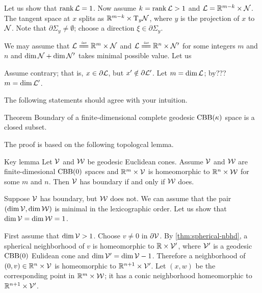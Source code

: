 Let us show that $\operatorname{\rm rank}\nolimits \mathcal{L}=1$.
Now assume $k=\operatorname{\rm rank}\nolimits \mathcal{L}>1$ and $\mathcal{L}=\mathbb{R}^{m-k}\times \mathcal{N}$.
The tangent space at $x$ splits as $\mathbb{R}^{m-k}\times \mathrm{T}_{y}\mathcal{N}$, where $y$ is the projection of $x$ to $\mathcal{N}$.
Note that $\partial\Sigma_y\ne\emptyset$;
choose a direction $\xi\in\partial\Sigma_y$.



We may assume that $\spc{L}\iso\RR^m\times \spc{N}$ and $\spc{L}\iso\RR^n\times \spc{N}'$
for some integers $m$ and $n$ and $\operatorname{\rm dim}\nolimits \mathcal{N}+\operatorname{\rm dim}\nolimits \mathcal{N}'$ takes minimal possible value.
Let us 

Assume contrary; that is, $x\in \partial \mathcal{L}$, but $x'\notin \partial \mathcal{L}'$.
Let $m=\operatorname{\rm dim}\nolimits \mathcal{L}$; by??? $m=\operatorname{\rm dim}\nolimits\mathcal{L}'$.

\qeds




The following statements should agree with your intuition.

\begin{thm}{Theorem}\label{thm:bry-closed}
Boundary of a finite-dimensional complete geodesic $\mathrm{CBB}(\kappa)$ space is a closed subset.
\end{thm}

The proof is based on the following topologcal lemma.

\begin{thm}{Key lemma}\label{lem:bry-closed:key}
Let $\mathcal{V}$ and $\mathcal{W}$ be geodesic Euclidean cones.
Assume $\mathcal{V}$ and $\mathcal{W}$ are finite-dimesional $\mathrm{CBB}(0)$ spaces
and $\mathbb{R}^{m}\times \mathcal{V}$ is homeomorphic to $\mathbb{R}^{n}\times \mathcal{W}$ for some $m$ and $n$.
Then $\mathcal{V}$ has boundary if and only if $\mathcal{W}$ does.
\end{thm}

Suppose $\mathcal{V}$ has boundary, but $\mathcal{W}$ does not.
We can assume that the pair $(\operatorname{\rm dim}\nolimits \mathcal{V},\operatorname{\rm dim}\nolimits \mathcal{W})$ is minimal in the lexicographic order.
Let us show that $\operatorname{\rm dim}\nolimits \mathcal{V}=\operatorname{\rm dim}\nolimits \mathcal{W}=1$.

First assume that $\operatorname{\rm dim}\nolimits \mathcal{V}>1$.
Choose $v\ne 0$ in $\partial\mathcal{V}$.
By \ref{thm:spherical-nbhd}, a spherical neighborhood of $v$ is homeomorphic to $\mathbb{R}\times \mathcal{V}'$, where $\mathcal{V}'$ is a geodesic $\mathrm{CBB}(0)$ Eulidean cone and $\operatorname{\rm dim}\nolimits \mathcal{V}'=\operatorname{\rm dim}\nolimits \mathcal{V}-1$.
Therefore a neighborhood of $(0, v)\in \mathbb{R}^n\times \mathcal{V}$ is homeomorphic to $\mathbb{R}^{n+1}\times \mathcal{V}'$.
Let $(x,w)$ be the corresponding point in $\mathbb{R}^m\times \mathcal{W}$;
it has a conic neighborhood homeomorphic to $\mathbb{R}^{n+1}\times \mathcal{V}'$.


